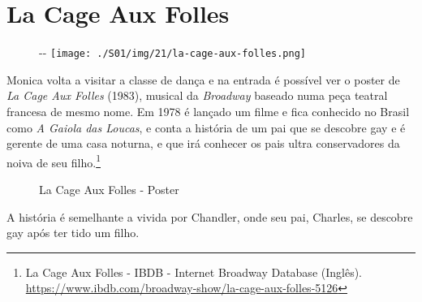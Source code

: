 \hypertarget{la-cage-aux-folles}{%
\section{La Cage Aux Folles}\label{la-cage-aux-folles}}

\begin{figure}[!ht]
  \begin{adjustwidth}{-\oddsidemargin-1in}{-\rightmargin}
    \centering
    \texttt{[image: ./S01/img/21/la-cage-aux-folles.png]}
  \end{adjustwidth}
\end{figure}

\saveparinfos
\noindent
\begin{minipage}[c]{0.5\textwidth}\useparinfo

Monica volta a visitar a classe de dança e na entrada é possível ver o
poster de \emph{La Cage Aux Folles} (1983), musical da \emph{Broadway}
baseado numa peça teatral francesa de mesmo nome. Em 1978 é lançado um
filme e fica conhecido no Brasil como \emph{A Gaiola das Loucas}, e
conta a história de um pai que se descobre gay e é gerente de uma casa
noturna, e que irá conhecer os pais ultra conservadores da noiva de seu
filho.\footnote{\sloppy La Cage Aux Folles - IBDB - Internet Broadway Database (Inglês). \url{https://www.ibdb.com/broadway-show/la-cage-aux-folles-5126}}

\end{minipage}\hfill
\begin{minipage}[c]{0.45\textwidth}

\begin{figure}
  \centering
    \caption{La Cage Aux Folles - Poster\label{fig:la-cage-aux-folles-poster}}
\end{figure}

\end{minipage}

A história é semelhante a vivida por Chandler, onde seu pai, Charles, se
descobre gay após ter tido um filho.

